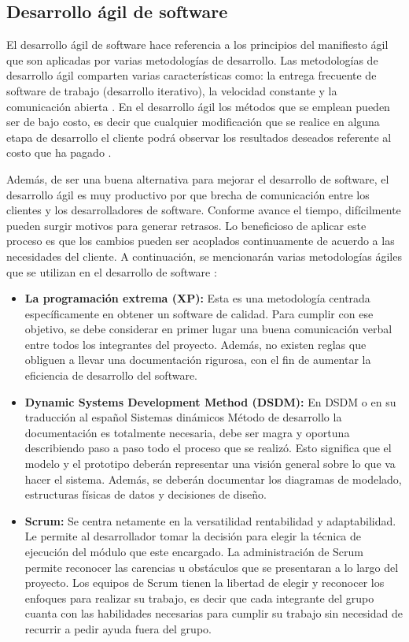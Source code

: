 \subsection{Desarrollo ágil de software}

El desarrollo ágil de software hace referencia a los principios del manifiesto ágil que son aplicadas por varias metodologías de desarrollo. Las metodologías de desarrollo ágil comparten varias características como: la entrega frecuente de software de trabajo (desarrollo iterativo), la velocidad constante y la comunicación abierta \cite{Whiting2022}. En el desarrollo ágil los métodos que se emplean pueden ser de bajo costo, es decir que cualquier modificación que se realice en alguna etapa de desarrollo el cliente podrá observar los resultados deseados referente al costo que ha pagado \cite{Shafiq2018}. 

Además, de ser una buena alternativa para mejorar el desarrollo de software, el desarrollo ágil es muy productivo por que brecha de comunicación entre los clientes y los desarrolladores de software. Conforme avance el tiempo, difícilmente pueden surgir motivos para generar retrasos. Lo beneficioso de aplicar este proceso es que los cambios pueden ser acoplados continuamente de acuerdo a las necesidades del cliente. A continuación, se mencionarán varias metodologías ágiles que se utilizan en el desarrollo de software \cite{Shafiq2018}:

\begin{itemize}
	\item \textbf{La programación extrema (XP):} Esta es una metodología centrada específicamente en obtener un software de calidad. Para cumplir con ese objetivo, se debe considerar en primer lugar una buena comunicación verbal entre todos los integrantes del proyecto. Además, no existen reglas que obliguen a llevar una documentación rigurosa, con el fin de aumentar la eficiencia de desarrollo del software.
	
	\item \textbf{Dynamic Systems Development Method (DSDM): }En DSDM o en su traducción al español Sistemas dinámicos Método de desarrollo la documentación es totalmente necesaria, debe ser magra y oportuna describiendo paso a paso todo el proceso que se realizó. Esto significa que el modelo y el prototipo deberán representar una visión general sobre lo que va hacer el sistema. Además, se deberán documentar los diagramas de modelado, estructuras físicas de datos y decisiones de diseño.
	
	\item \textbf{Scrum: } Se centra netamente en la versatilidad rentabilidad y adaptabilidad. Le permite al desarrollador tomar la decisión para elegir la técnica de ejecución del módulo que este encargado. La administración de Scrum permite reconocer las carencias u obstáculos que se presentaran a lo largo del proyecto. Los equipos de Scrum tienen la libertad de elegir y reconocer los enfoques para realizar su trabajo, es decir que cada integrante del grupo cuanta con las habilidades necesarias para cumplir su trabajo sin necesidad de recurrir a pedir ayuda fuera del grupo.
\end{itemize}


